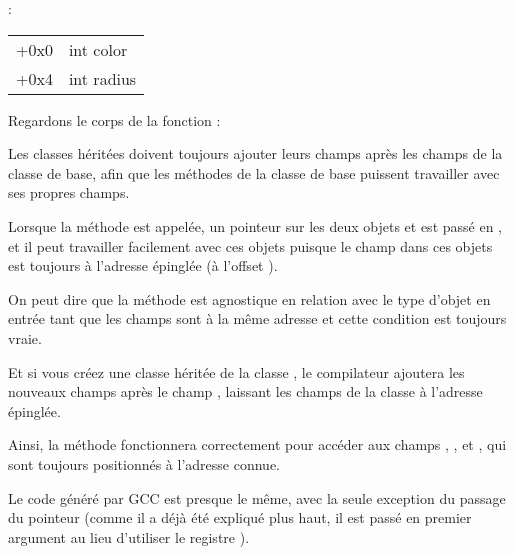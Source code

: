 :

\begin{center}
\begin{tabular}{ | l | l | }
\hline
  \tableheader{} \\
\hline
  +0x0 & int color \\
\hline
  +0x4 & int radius \\
\hline
\end{tabular}
\end{center}

Regardons le corps de la fonction \main:




Les classes héritées doivent toujours ajouter leurs champs après les champs de la
classe de base, afin que les méthodes de la classe de base puissent travailler avec
ses propres champs.


Lorsque la méthode  est appelée, un pointeur sur les deux
objets  et  est passé en , et il peut travailler facilement
avec ces objets puisque le champ  dans ces objets est toujours à l'adresse
épinglée (à l'offset ).

On peut dire que la méthode  est agnostique en relation
avec le type d'objet en entrée tant que les champs sont  à la même adresse
et cette condition est toujours vraie.


Et si vous créez une classe héritée de la classe , le compilateur ajoutera
les nouveaux champs après le champ , laissant les champs de la classe
 à l'adresse épinglée.


Ainsi, la méthode  fonctionnera correctement pour accéder aux champs
, ,  et , qui sont toujours positionnés
à l'adresse connue.

Le code généré par GCC est presque le même, avec la seule exception du passage du
pointeur  (comme il a déjà été expliqué plus haut, il est passé en premier
argument au lieu d'utiliser le registre \ECX).
